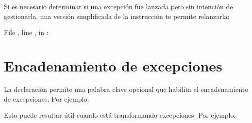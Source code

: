 \documentclass[a4,10pt,spanish]{sphinxmanual}
\begin{document}
\begin{sphinxVerbatim}[commandchars=\\\{\}]
   
\end{sphinxVerbatim}

\sphinxAtStartPar
Si es necesario determinar si una excepción fue lanzada pero sin intención de gestionarla, una versión simplificada de la instrucción  te permite relanzarla:

\begin{sphinxVerbatim}[commandchars=\\\{\}]
     
 
    
    
  File , line , in 
: 
\end{sphinxVerbatim}


\section{Encadenamiento de excepciones}
\label{\detokenize{tutorial/errors:exception-chaining}}\label{\detokenize{tutorial/errors:tut-exception-chaining}}
\sphinxAtStartPar
La declaración  permite una palabra clave opcional  que habilita el encadenamiento de excepciones. Por ejemplo:

\begin{sphinxVerbatim}[commandchars=\\\{\}]
   
\end{sphinxVerbatim}

\sphinxAtStartPar
Esto puede resultar útil cuando está transformando excepciones. Por ejemplo:
\end{document}
